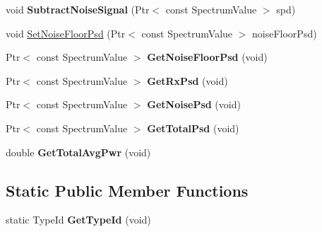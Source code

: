 \begin{DoxyCompactItemize}
\item 
\hypertarget{classns3_1_1PLC__SpectrumInterference_aea99500c8d44460543847daa77df97b8}{void {\bfseries \-Subtract\-Noise\-Signal} (\-Ptr$<$ const \-Spectrum\-Value $>$ spd)}\label{classns3_1_1PLC__SpectrumInterference_aea99500c8d44460543847daa77df97b8}

\item 
void \hyperlink{classns3_1_1PLC__SpectrumInterference_a3c2bffd9d25747fa0bf492e70404835f}{\-Set\-Noise\-Floor\-Psd} (\-Ptr$<$ const \-Spectrum\-Value $>$ noise\-Floor\-Psd)
\item 
\hypertarget{classns3_1_1PLC__SpectrumInterference_a2175862355e973da8f48605d8aa3c647}{\-Ptr$<$ const \-Spectrum\-Value $>$ {\bfseries \-Get\-Noise\-Floor\-Psd} (void)}\label{classns3_1_1PLC__SpectrumInterference_a2175862355e973da8f48605d8aa3c647}

\item 
\hypertarget{classns3_1_1PLC__SpectrumInterference_ae29f140da034cddd90ad63e7b59ec3f4}{\-Ptr$<$ const \-Spectrum\-Value $>$ {\bfseries \-Get\-Rx\-Psd} (void)}\label{classns3_1_1PLC__SpectrumInterference_ae29f140da034cddd90ad63e7b59ec3f4}

\item 
\hypertarget{classns3_1_1PLC__SpectrumInterference_a4a5309f7bc2463a31d15d04c66b62f98}{\-Ptr$<$ const \-Spectrum\-Value $>$ {\bfseries \-Get\-Noise\-Psd} (void)}\label{classns3_1_1PLC__SpectrumInterference_a4a5309f7bc2463a31d15d04c66b62f98}

\item 
\hypertarget{classns3_1_1PLC__SpectrumInterference_a1c7bda27aca1257bc6ec0e57f5484463}{\-Ptr$<$ const \-Spectrum\-Value $>$ {\bfseries \-Get\-Total\-Psd} (void)}\label{classns3_1_1PLC__SpectrumInterference_a1c7bda27aca1257bc6ec0e57f5484463}

\item 
\hypertarget{classns3_1_1PLC__SpectrumInterference_ac9da4cb01252b1d52a9c94f3960cf611}{double {\bfseries \-Get\-Total\-Avg\-Pwr} (void)}\label{classns3_1_1PLC__SpectrumInterference_ac9da4cb01252b1d52a9c94f3960cf611}

\end{DoxyCompactItemize}
\subsection*{\-Static \-Public \-Member \-Functions}
\begin{DoxyCompactItemize}
\item 
\hypertarget{classns3_1_1PLC__SpectrumInterference_a643276e4b584083d4c9dc4b9916f2e69}{static \-Type\-Id {\bfseries \-Get\-Type\-Id} (void)}\label{classns3_1_1PLC__SpectrumInterference_a643276e4b584083d4c9dc4b9916f2e69}

\end{DoxyCompactItemize}
